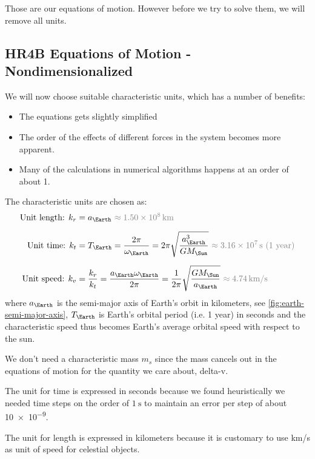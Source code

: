 Those are our equations of motion. However before we try to solve them, we will remove all units.

\subsection{HR4B Equations of Motion - Nondimensionalized}
We will now choose suitable characteristic units, which has a number of benefits:
\begin{itemize}
    \item The equations gets slightly simplified
    \item The order of the effects of different forces in the system becomes more apparent.
    \item Many of the calculations in numerical algorithms happens at an order of about 1. 
\end{itemize}

The characteristic units are chosen as:
\begin{align}
    \text{Unit length: } k_r &= a_{\Earth}\ {\color{gray} \approx \SI{1.50e8}{\km}}  \\[0.2cm]
    \text{Unit time: } k_t &= T_{\Earth} = \frac{2\pi}{\omega_\Earth} = 2\pi \sqrt{\frac{a_\Earth^3}{G M_\Sun}}\ {\color{gray} \approx \SI{3.16e7}{\s} \text{ (1 year)}} \\[0.2cm]
    \text{Unit speed: } k_v &= \frac{k_r}{k_t} = \frac{a_\Earth \omega_\Earth}{2\pi} = \frac{1}{2\pi} \sqrt{\frac{G M_\Sun}{a_\Earth}}\ {\color{gray} \approx \SI{4.74}{\km/\s}}
\end{align}
where \(a_\Earth\) is the semi-major axis of Earth's orbit in kilometers, see \cref{fig:earth-semi-major-axis}, \(T_\Earth\) is Earth's orbital period (i.e. 1 year) in seconds and the characteristic speed thus becomes Earth's average orbital speed with respect to the sun.

We don't need a characteristic mass \(m_s\) since the mass cancels out in the equations of motion for the quantity we care about, delta-v.

The unit for time is expressed in seconds because we found heuristically we needed time steps on the order of \(\SI{1}{\s}\) to maintain an error per step of about \num{10e-9}.

The unit for length is expressed in kilometers because it is customary to use \si{\km/\s} as unit of speed for celestial objects.

